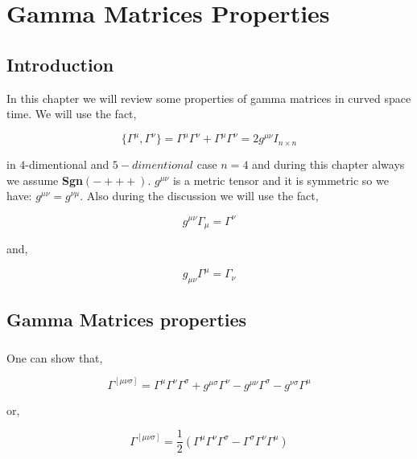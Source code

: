 \chapter{Gamma Matrices Properties}
\label{ch:GammaMatricesProperties}

\section{Introduction}

In this chapter we will review some properties of gamma matrices in curved space time. We will use the fact,

\begin{equation}
   \{\Gamma^{\mu},\Gamma^{\nu}\} = \Gamma^{\mu}\Gamma^{\nu} + \Gamma^{\mu}\Gamma^{\nu} = 2 g^{\mu\nu}I_{n\times n}
\end{equation}

in $4$-dimentional and $5-dimentional$ case $n=4$ and during this chapter always we assume \textbf{Sgn}$(-+++)$. $g^{\mu\nu}$ is a metric tensor and it is symmetric so we have: $g^{\mu\nu}=g^{\nu\mu}$. Also during the discussion we will use the fact,

\begin{equation}
   g^{\mu\nu}\Gamma_{\mu} = \Gamma^{\nu}
\end{equation}

and,
   
\begin{equation}
   g_{\mu\nu}\Gamma^{\mu} = \Gamma_{\nu}
\end{equation}

\section{Gamma Matrices properties}

\subsection{}

One can show that,

\begin{equation}
   \Gamma^{[\mu\nu\sigma]} = \Gamma^{\mu}\Gamma^{\nu}\Gamma^{\sigma} + g^{\mu\sigma}\Gamma^{\nu} - g^{\mu\nu}\Gamma^{\sigma} - g^{\nu\sigma} \Gamma^{\mu}
\end{equation}

or, 

\begin{equation}
   \Gamma^{[\mu\nu\sigma]} = \frac{1}{2}\left(\Gamma^{\mu}\Gamma^{\nu}\Gamma^{\sigma} - \Gamma^{\sigma}\Gamma^{\nu}\Gamma^{\mu}\right)
\end{equation}

